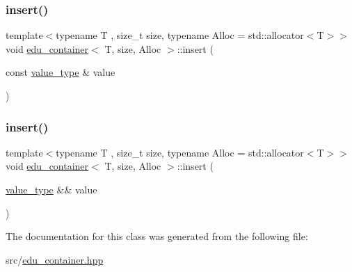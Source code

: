 \mbox{\label{classedu__container_ac104fcdf3c6c2684e53a05d715327f6f}} 
\subsubsection{\texorpdfstring{insert()}{insert()}\hspace{0.1cm}{\footnotesize\ttfamily [1/2]}}
{\footnotesize\ttfamily template$<$typename T , size\+\_\+t size, typename Alloc  = std\+::allocator$<$\+T$>$$>$ \\
void \hyperlink{classedu__container}{edu\+\_\+container}$<$ T, size, Alloc $>$\+::insert (\begin{DoxyParamCaption}\item[{const \hyperlink{classedu__container_a1a1a693013d3f6fd261d6e3532ec2a11}{value\+\_\+type} \&}]{value }\end{DoxyParamCaption})\hspace{0.3cm}{\ttfamily [inline]}}

\mbox{\label{classedu__container_aa27f03449ca0e27ac7ae7a91b079afff}} 
\subsubsection{\texorpdfstring{insert()}{insert()}\hspace{0.1cm}{\footnotesize\ttfamily [2/2]}}
{\footnotesize\ttfamily template$<$typename T , size\+\_\+t size, typename Alloc  = std\+::allocator$<$\+T$>$$>$ \\
void \hyperlink{classedu__container}{edu\+\_\+container}$<$ T, size, Alloc $>$\+::insert (\begin{DoxyParamCaption}\item[{\hyperlink{classedu__container_a1a1a693013d3f6fd261d6e3532ec2a11}{value\+\_\+type} \&\&}]{value }\end{DoxyParamCaption})\hspace{0.3cm}{\ttfamily [inline]}}



The documentation for this class was generated from the following file\+:\begin{DoxyCompactItemize}
\item 
src/\hyperlink{edu__container_8hpp}{edu\+\_\+container.\+hpp}\end{DoxyCompactItemize}
